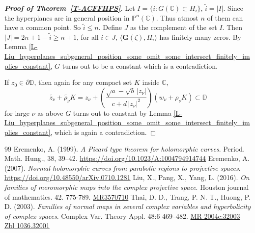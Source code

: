 \documentclass[10pt,a4paper]{amsart}
\begin{document}
\begin{proof}[{\bf Proof of Theorem~\ref{T-ACFFHPS}}]
Let $I=\{i:G(\mathbb C)\subset H_i\}$, $\widetilde{i}=|I|$. Since the hyperplanes are in general position in $\mathbb P^n(\mathbb C)$.
Thus atmost $n$ of them can have a common point. So $\widetilde{i}\leq n$. Define $J$ as the complement of the set $I$. Then $|J|=2n+1-\widetilde{i}\geq n+1$, for all 
$i\in J$, $\langle \mathbf{G}(\zeta),H_i\rangle$ has finitely many zeros. By Lemma 
\ref{L-Liu_hyperplanes_subgeneral_position_some_omit_some_intersect_finitely_implies_constant}, $G$ turns out to be a constant which is a contradiction. \smallskip

If $z_0\in\partial\mathbb D$, then again for any compact set $K$ inside $\mathbb C$, $$\widetilde{z_{\nu}}+\widetilde{\rho_{\nu}}K=z_{\nu}+\left(\frac{\sqrt{a}-\sqrt{b}\,|z_{\nu}|}{c+d\,|z_{\nu}|^2}\right)(w_{\nu}+\rho_{\nu} K)\subset\mathbb D$$ for large $\nu$ as above $G$ turns out to constant by Lemma
\ref{L-Liu_hyperplanes_subgeneral_position_some_omit_some_intersect_finitely_implies_constant}, 
which is again a contradiction. 
\end{proof}

\begin{thebibliography}{99}
 \label{ere-apttfhc-1999} Eremenko, A. (1999). \textit{A Picard type theorem for holomorphic curves}. Period. Math. Hung., 38, 39–42. \url{https://doi.org/10.1023/A:1004794914744}
 \label{ere-nhcfprtps-2007} Eremenko, A. (2007). \textit{Normal holomorphic curves from parabolic regions to projective spaces}. \url{https://doi.org/10.48550/arXiv.0710.1281}
 \label{liu-ofommitcps-2016} Liu, X., Pang, X., Yang, L. (2016). \textit{On families of meromorphic maps into the complex projective space}. Houston journal of mathematics. 42. 775-789. \url{MR3570710}
 \label{thai-fonmiscvahocs-2003} Thai, D. D., Trang, P. N. T., Huong, P. D. (2003). \textit{Families of normal maps in several complex variables and hyperbolicity of complex spaces}. Complex Var. Theory Appl. 48:6 469–482. \url{MR 2004c:32003 Zbl 1036.32001}
\end{thebibliography}
\end{document}
